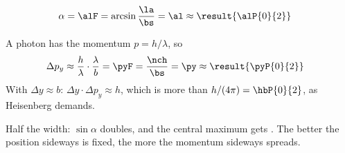 \begin{abcliste}
\abc
\begin{align}
 \alpha &= \alF = \arcsin\frac{\la}{\bs} = \al \approx \result{\alP{0}{2}}
\end{align}

\abc A photon has the momentum $p = h/\lambda$, so
\begin{align}
 \Delta p_y &\approx \frac{h}{\lambda}\cdot\frac{\lambda}{b} = \pyF = \frac{\nch}{\bs} = \py \approx \result{\pyP{0}{2}}
\end{align}
With $\Delta y \approx b$: $\Delta y\cdot\Delta p_y \approx h$, which is more than $h/(4\pi) = \hbP{0}{2}$, as Heisenberg demands.

\abc Half the width: $\sin\alpha$ doubles, and the central maximum gets . The better the position sideways is fixed, the more the momentum sideways spreads.
\end{abcliste}
